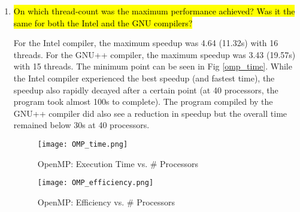 \documentclass{article}
\begin{document}
\begin{enumerate}
	\item \hl{On which thread-count was the maximum performance achieved? Was it the same for both the Intel and the GNU compilers?}

	For the Intel compiler, the maximum speedup was 4.64 (11.32s) with 16 threads. For the GNU++ compiler, the maximum speedup was 3.43 (19.57s) with 15 threads. The minimum point can be seen in Fig \ref{omp_time}. While the Intel compiler experienced the best speedup (and fastest time), the speedup also rapidly decayed after a certain point (at 40 processors, the program took almost 100s to complete). The program compiled by the GNU++ compiler did also see a reduction in speedup but the overall time remained below 30s at 40 processors.
	
		\begin{figure}[h!] %
	 	\begin{center}
	 		\texttt{[image: OMP\_time.png]} %
	 		\caption{OpenMP: Execution Time vs. \# Processors}
	 		\label{fig:omp_time}
	 	\end{center}
	\end{figure}
	
			\begin{figure}[h!] %
	 	\begin{center}
	 		\texttt{[image: OMP\_efficiency.png]} %
	 		\caption{OpenMP: Efficiency vs. \# Processors}
	 		\label{fig:omp_efficiency}
	 	\end{center}
	\end{figure}

\end{enumerate}
\end{document}
